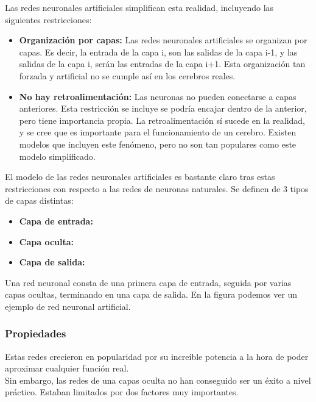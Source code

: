 Las redes neuronales artificiales simplifican esta realidad, incluyendo las siguientes restricciones:
\begin{itemize}
\item \textbf{Organización por capas:} Las redes neuronales artificiales se organizan por capas. Es decir, la entrada de la capa i, son las salidas de la capa i-1, y las salidas de la capa i, serán las entradas de la capa i+1. Esta organización tan forzada y artificial no se cumple así en los cerebros reales. 
\item \textbf{No hay retroalimentación:} Las neuronas no pueden conectarse a capas anteriores. Esta restricción se incluye se podría encajar dentro de la anterior, pero tiene importancia propia. La retroalimentación sí sucede en la realidad, y se cree que es importante para el funcionamiento de un cerebro. Existen modelos que incluyen este fenómeno, pero no son tan populares como este modelo simplificado. 
\end{itemize}

El modelo de las redes neuronales artificiales es bastante claro tras estas restricciones con respecto a las redes de neuronas naturales. Se definen de 3 tipos de capas distintas:
\begin{itemize}
\item \textbf{Capa de entrada:} 
\item \textbf{Capa oculta:}
\item \textbf{Capa de salida:}
\end{itemize}

Una red neuronal consta de una primera capa de entrada, seguida por varias capas ocultas, terminando en una capa de salida. En la figura  podemos ver un ejemplo de red neuronal artificial.\\

\subsubsection{Propiedades}

Estas redes crecieron en popularidad por su increíble potencia a la hora de poder aproximar cualquier función real. \\

Sin embargo, las redes de una capas oculta no han conseguido ser un éxito a nivel práctico. Estaban limitados por dos factores muy importantes. \\

